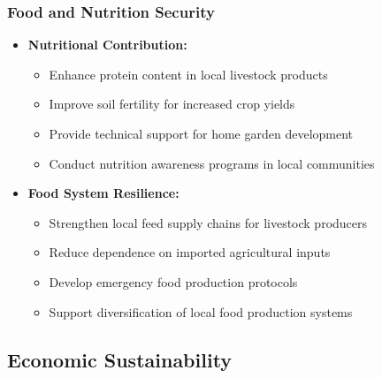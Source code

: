 \subsubsection{Food and Nutrition Security}
\begin{itemize}
    \item \textbf{Nutritional Contribution:}
    \begin{itemize}
        \item Enhance protein content in local livestock products
        \item Improve soil fertility for increased crop yields
        \item Provide technical support for home garden development
        \item Conduct nutrition awareness programs in local communities
    \end{itemize}
    
    \item \textbf{Food System Resilience:}
    \begin{itemize}
        \item Strengthen local feed supply chains for livestock producers
        \item Reduce dependence on imported agricultural inputs
        \item Develop emergency food production protocols
        \item Support diversification of local food production systems
    \end{itemize}
\end{itemize}

\subsection{Economic Sustainability}

